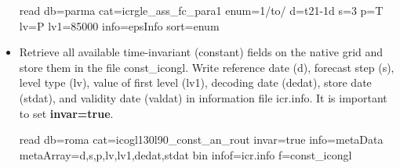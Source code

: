 \begin{itemize}
\begin{skydb}
read db=parma cat=icrgle_ass_fc_para1 enum=1/to/ d=t21-1d s=3 p=T lv=P lv1=85000 info=epsInfo sort=enum
\end{skydb}

\item Retrieve all available time-invariant (constant) fields on the native grid and store them in the file const\_icongl. 
Write reference date (d), forecast step (s), level type (lv), value of first level (lv1), decoding date (dedat), 
store date (stdat), and validity date (valdat) in information file icr.info. It is important to set \textbf{invar=true}.

\begin{skydb}
read db=roma cat=icogl130l90_const_an_rout invar=true info=metaData metaArray=d,s,p,lv,lv1,dedat,stdat bin infof=icr.info f=const_icongl
\end{skydb}

\end{itemize}
